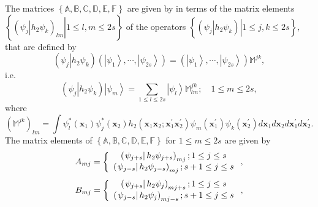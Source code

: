 \documentclass[aps,preprint]{revtex4}%
\begin{document}
The matrices $\left\{  \mathbb{A},\mathbb{B},\mathbb{C},\mathbb{D}%
,\mathbb{E},\mathbb{F}\right\}  $ are given by in terms of the matrix elements
$\left\{  \left.  \left(  \left.  \psi_{j}\right\vert h_{2}\psi_{k}\right)
_{lm}\right\vert 1\leq l,m\leq2s\right\}  $ of the operators $\left\{  \left.
\left(  \left.  \psi_{j}\right\vert h_{2}\psi_{k}\right)  \right\vert 1\leq
j,k\leq2s\right\}  ,$ that are defined by
\begin{equation}
\left(  \left.  \psi_{j}\right\vert h_{2}\psi_{k}\right)  \left(  \left\vert
\psi_{1}\right\rangle ,\cdots,\left\vert \psi_{2s}\right\rangle \right)
=\left(  \left\vert \psi_{1}\right\rangle ,\cdots,\left\vert \psi
_{2s}\right\rangle \right)  \mathbb{M}^{jk},
\end{equation}
i.e.
\begin{equation}
\left(  \left.  \psi_{j}\right\vert h_{2}\psi_{k}\right)  \left\vert \psi
_{m}\right\rangle =%
{\textstyle\sum\limits_{1\leq l\leq2s}}
\left\vert \psi_{l}\right\rangle \mathbb{M}_{lm}^{jk};\quad1\leq m\leq2s,
\end{equation}
where
\begin{equation}
\left(  \mathbb{M}^{jk}\right)  _{lm}=\int\psi_{l}^{\ast}\left(
\mathbf{x}_{1}\right)  \psi_{j}^{\ast}\left(  \mathbf{x}_{2}\right)
h_{2}\left(  \mathbf{x}_{1}\mathbf{x}_{2};\mathbf{x}_{1}^{\prime}%
\mathbf{x}_{2}^{\prime}\right)  \psi_{m}\left(  \mathbf{x}_{1}^{\prime
}\right)  \psi_{k}\left(  \mathbf{x}_{2}^{\prime}\right)  d\mathbf{x}%
_{1}d\mathbf{x}_{2}d\mathbf{x}_{1}^{\prime}d\mathbf{x}_{2}^{\prime}.
\end{equation}
The matrix elements of $\left\{  \mathbb{A},\mathbb{B},\mathbb{C}%
,\mathbb{D},\mathbb{E},\mathbb{F}\right\}  $ for $1\leq m\leq2s$ are given by
\begin{equation}
A_{mj}=\left\{
\begin{array}
[c]{c}%
\left(  \left.  \psi_{j+s}\right\vert h_{2}\psi_{j+s}\right)  _{mj};1\leq
j\leq s\\
\left(  \left.  \psi_{j-s}\right\vert h_{2}\psi_{j-s}\right)  _{mj};s+1\leq
j\leq s
\end{array}
\right.  ,
\end{equation}%
\begin{equation}
B_{mj}=\left\{
\begin{array}
[c]{c}%
\left(  \left.  \psi_{j+s}\right\vert h_{2}\psi_{j}\right)  _{mj+s};1\leq
j\leq s\\
\left(  \left.  \psi_{j-s}\right\vert h_{2}\psi_{j}\right)  _{mj-s};s+1\leq
j\leq s
\end{array}
\right.  ,
\end{equation}
\end{document}
